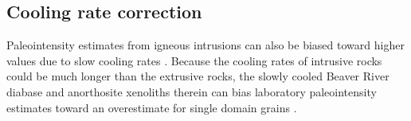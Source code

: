 \documentclass[9pt,twocolumn,twoside,lineno]{pnas-new}
\begin{document}

\subsection*{Cooling rate correction}
Paleointensity estimates from igneous intrusions can also be biased toward higher values due to slow cooling rates \cite{Halgedahl1980a}. Because the cooling rates of intrusive rocks could be much longer than the extrusive rocks, the slowly cooled Beaver River diabase and anorthosite xenoliths therein can bias laboratory paleointensity estimates toward an overestimate for single domain grains \cite{Dodson1980a, Halgedahl1980a, Selkin2000a}. 
\end{document}
